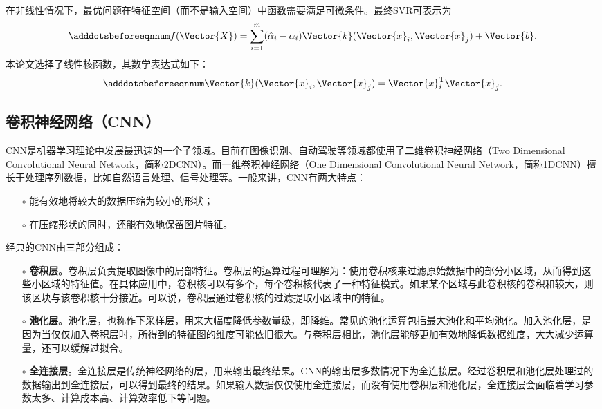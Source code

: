 在非线性情况下，最优问题在特征空间（而不是输入空间）中函数需要满足可微条件。最终SVR可表示为
\begin{equation}\adddotsbeforeeqnnum
  \label{eq:ml_svr_kernel_v2}
  f(\Vector{X})=\sum_{i=1}^{m}(\hat{\alpha}_i-\alpha_i)\Vector{k}(\Vector{x}_i,\Vector{x}_j)+\Vector{b}.
\end{equation}
本论文选择了线性核函数，其数学表达式如下：
\begin{equation}\adddotsbeforeeqnnum
  \label{eq:ml_svr_kernel_linear}
  \Vector{k}(\Vector{x}_i,\Vector{x}_j)=\Vector{x}_i^{\text{T}}\Vector{x}_j.
\end{equation}

\subsection{卷积神经网络（CNN）}\label{sec:ml_cnn}

CNN是机器学习理论中发展最迅速的一个子领域。目前在图像识别、自动驾驶等领域都使用了二维卷积神经网络（Two Dimensional Convolutional Neural Network，简称2DCNN）。而一维卷积神经网络（One Dimensional Convolutional Neural Network，简称1DCNN）擅长于处理序列数据，比如自然语言处理、信号处理等。一般来讲，CNN有两大特点：
\begin{itemize}
  \item[$\circ$] 能有效地将较大的数据压缩为较小的形状；
  \item[$\circ$] 在压缩形状的同时，还能有效地保留图片特征。
\end{itemize}

经典的CNN由三部分组成：
\begin{itemize}
  \item[$\circ$] \textbf{卷积层}。卷积层负责提取图像中的局部特征。卷积层的运算过程可理解为：使用卷积核来过滤原始数据中的部分小区域，从而得到这些小区域的特征值。在具体应用中，卷积核可以有多个，每个卷积核代表了一种特征模式。如果某个区域与此卷积核的卷积和较大，则该区块与该卷积核十分接近。可以说，卷积层通过卷积核的过滤提取小区域中的特征。
  \item[$\circ$] \textbf{池化层}。池化层，也称作下采样层，用来大幅度降低参数量级，即降维。常见的池化运算包括最大池化和平均池化。加入池化层，是因为当仅仅加入卷积层时，所得到的特征图的维度可能依旧很大。与卷积层相比，池化层能够更加有效地降低数据维度，大大减少运算量，还可以缓解过拟合。
  \item[$\circ$] \textbf{全连接层}。全连接层是传统神经网络的层，用来输出最终结果。CNN的输出层多数情况下为全连接层。经过卷积层和池化层处理过的数据输出到全连接层，可以得到最终的结果。如果输入数据仅仅使用全连接层，而没有使用卷积层和池化层，全连接层会面临着学习参数太多、计算成本高、计算效率低下等问题。
\end{itemize}

